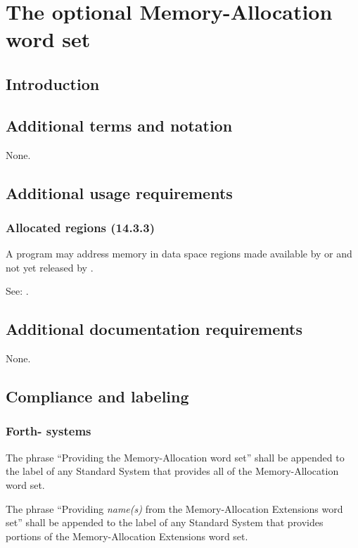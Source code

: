 \chapter{The optional Memory-Allocation word set} %

\section{Introduction} %

\section{Additional terms and notation} %
None.

\section{Additional usage requirements} %

\setcounter{subsection}{2}
\subsection{Allocated regions (14.3.3)} %

A program may address memory in data space regions made available
by  or  and not yet released by .

See: .


\section{Additional documentation requirements} %
\label{mem:docs}

None.

\section{Compliance and labeling} %

\subsection{Forth-\snapshot{} systems} %

The phrase ``Providing the Memory-Allocation word set'' shall be
appended to the label of any Standard System that provides all of
the Memory-Allocation word set.

The phrase ``Providing \emph{name(s)} from the Memory-Allocation
Extensions word set'' shall be appended to the label of any Standard
System that provides portions of the Memory-Allocation Extensions
word set.

